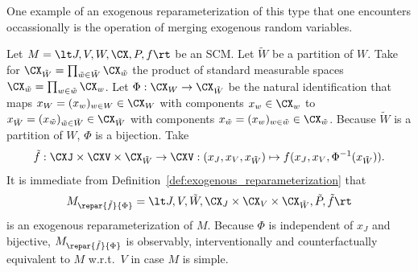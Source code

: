 One example of an exogenous reparameterization of this type that one encounters occassionally is the operation of merging exogenous random variables.
\begin{Eg}\label{eg:merging_exogenous_random_variables}
  Let $M = \lt J, V, W, \CX, P, f \rt$ be an SCM.
  Let $\tilde{W}$ be a partition of $W$.
  Take for $\CX_{\tilde{W}} = \prod_{\tilde{w}\in\tilde{W}} \CX_{\tilde{w}}$ the product of standard measurable spaces $\CX_{\tilde{w}} = \prod_{w \in \tilde{w}} \CX_w$. 
  Let $\Phi : \CX_W \to \CX_{\tilde{W}}$ be the natural identification that
  maps $x_W = (x_w)_{w\in W} \in \CX_W$ with components $x_w \in \CX_w$ to $x_{\tilde{W}} = (x_{\tilde{w}})_{\tilde{w}\in\tilde{W}} \in \CX_{\tilde{W}}$ with components $x_{\tilde{w}} = (x_w)_{w \in \tilde{w}} \in \CX_{\tilde{w}}$.
  Because $\tilde{W}$ is a partition of $W$, $\Phi$ is a bijection.
  Take
  $$\tilde{f} : \CXJ \times \CXV \times \CX_{\tilde{W}} \to \CXV : (x_J,x_V,x_{\tilde{W}}) \mapsto f(x_J,x_V,\Phi^{-1}(x_{\tilde{W}})).$$
  It is immediate from Definition~\ref{def:exogenous_reparameterization} that 
  $$M_{\repar{\tilde{f}}{\Phi}} = \lt J, V, \tilde{W}, \CX_J \times \CX_V \times \CX_{\tilde{W}}, \tilde{P}, \tilde{f} \rt$$
  is an exogenous reparameterization of $M$.
  Because $\Phi$ is independent of $x_J$ and bijective, $M_{\repar{\tilde{f}}{\Phi}}$ is observably, interventionally and counterfactually equivalent to $M$ w.r.t.\ $V$ in case $M$ is simple.
\end{Eg}

